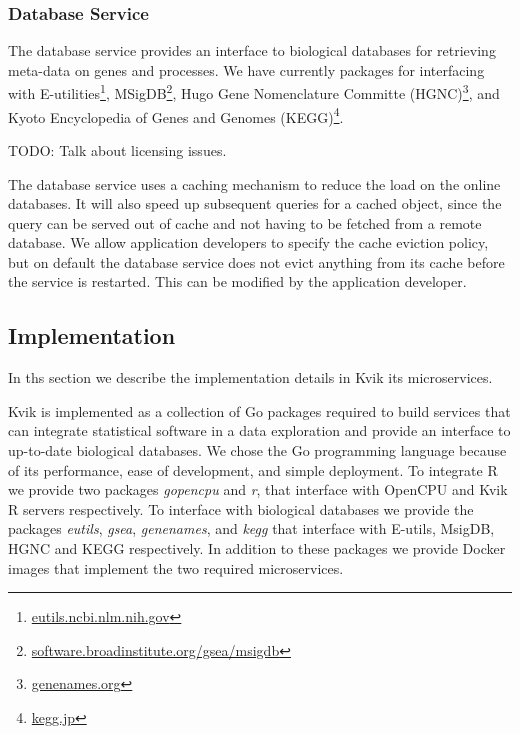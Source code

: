 \subsubsection*{Database Service} 
The database service provides an interface to biological databases for
retrieving meta-data on genes and processes. 
We have currently packages for
interfacing with
E-utilities\footnote{\url{eutils.ncbi.nlm.nih.gov}},
MSigDB\footnote{\url{software.broadinstitute.org/gsea/msigdb}}, Hugo Gene
Nomenclature Committe (HGNC)\footnote{\url{genenames.org}}, and Kyoto Encyclopedia
of Genes and Genomes (KEGG)\footnote{\url{kegg.jp}}. 

TODO: Talk about licensing issues. 

The database service uses a caching mechanism to reduce the load on the online
databases. It will also speed up subsequent queries for a cached object, since
the query can be served out of cache and not having to be fetched from a remote
database. 
We allow application developers to specify the cache eviction policy,
but on default the database service does not evict anything from its cache
before the service is restarted. This can be modified by the application
developer. 



\subsection*{Implementation}
In ths section we describe the implementation details in Kvik its
microservices.

Kvik is implemented as a collection of Go packages required to build services
that can integrate statistical
software in a data exploration and provide an interface to up-to-date biological
databases. We chose the Go programming language because of its performance, ease
of development, and simple deployment. 
To integrate R we provide two packages \emph{gopencpu} and
\emph{r}, that interface with OpenCPU and Kvik R servers respectively. To
interface with biological databases we provide the packages \emph{eutils},
\emph{gsea}, \emph{genenames}, and \emph{kegg} that interface with E-utils,
MsigDB, HGNC and KEGG respectively.
In addition to these packages we provide Docker images that implement the
two required microservices. 

